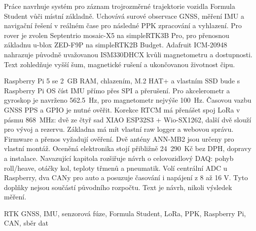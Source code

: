 \begin{abstractCZ}
Práce navrhuje systém pro záznam trojrozměrné trajektorie vozidla Formula
Student vůči místní základně. Uchovává surové observace GNSS, měření IMU
a navigační řešení v reálném čase pro následné PPK zpracování a vyhlazení.
Pro rover je zvolen Septentrio mosaic-X5 na simpleRTK3B Pro, pro přenosnou
základnu u-blox ZED-F9P na simpleRTK2B Budget. Adafruit ICM-20948 nahrazuje
původně uvažovanou ISM330DHCX kvůli magnetometru a dostupnosti. Text
zohledňuje vyšší šum, magnetické rušení a ukončovanou životnost čipu.

Raspberry Pi 5 se 2~GB RAM, chlazením, M.2 HAT+ a vlastním SSD bude
s Raspberry Pi OS číst IMU přímo přes SPI a přerušení. Pro akcelerometr
a gyroskop je navrženo \SI{562.5}{Hz}, pro magnetometr nejvýše
\SI{100}{Hz}. Časovou vazbu GNSS PPS a GPIO je nutné ověřit.
Korekce RTCM má přenášet spoj LoRa v pásmu 868~MHz: dvě ze čtyř sad
XIAO ESP32S3 + Wio-SX1262, další dvě slouží pro vývoj a rezervu.
Základna má mít vlastní raw logger a webovou správu. Firmware a přenos
vyžadují ověření. Dvě antény ANN-MB2 jsou určeny pro vlastní montáž.
Oceněná elektronika stojí přibližně 24~290~Kč bez DPH, dopravy a instalace.
Navazující kapitola rozšiřuje návrh o celovozidlový DAQ: pohyb roll/heave,
otáčky kol, teploty třmenů a pneumatik. Volí centrální ADC u Raspberry,
dva CANy pro auto a posuzuje časování i napájení z 8 až 16 V. Tyto doplňky
nejsou součástí původního rozpočtu. Text je návrh, nikoli výsledek měření.
\end{abstractCZ}

\begin{keywordsCZ}
RTK GNSS, IMU, senzorová fúze, Formula Student, LoRa, PPK, Raspberry Pi, CAN, sběr dat
\end{keywordsCZ}

